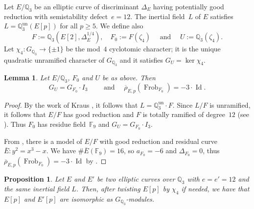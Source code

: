 \documentclass[12pt]{amsart}
\numberwithin{equation}{section}
\newtheorem{lemma}[equation]{Lemma}
\newtheorem{proposition}[equation]{Proposition}
\theoremstyle{definition}
\newcommand{\F}{\mathbb{F}}
\newcommand{\Q}{\mathbb{Q}}
\newcommand{\rhobar}{{\overline{\rho}}}
\DeclareMathOperator{\Frob}{Frob}
\DeclareMathOperator{\Id}{Id}
\begin{document}
Let $E/\Q_3$ be an elliptic curve of discriminant $\Delta_E$ having potentially good reduction with semistability defect~$e=12$.
The inertial field~$L$ of $E$ satisfies
$L = \Q_3^{\text{un}}(E[p])$ for all $p \geq 5$.
We define also
\[
F:=\Q_3(E[2], \Delta_E^{1/4}), \quad F_0:=F(\zeta_4) \quad \text{ and } \quad U:=\Q_3(\zeta_4).
\]
Let $\chi_4 : G_{\Q_3} \to \{ \pm 1 \}$ be the mod~$4$ cyclotomic character; it is the unique quadratic unramified character of $G_{\Q_3}$ and it satisfies $G_U = \ker \chi_4$.
\begin{lemma}\label{lem:l3non-ab}
    Let $E/\Q_3$, $F_0$ and $U$ be as above. Then
    \[
     G_{U}=G_{F_0} \cdot I_3 \qquad \text{ and } \quad \rhobar_{E,p}(\Frob_{F_0})=-3 \cdot \Id.
    \]
\end{lemma}
\begin{proof}
    By the work of Kraus \cite[Corollaire to Lemme 3]{Kraus}, it follows that $L=\Q_3^{\text{un}}\cdot F$.
    Since $L/F$ is unramified, it follows that $E/F$ has good reduction and
    $F$ is totally ramified of degree~$12$ (see \cite[Remark 3.1]{Cop3adic}). Thus $F_0$ has residue field~$\F_9$ and $G_{U}=G_{F_0} \cdot I_3$.

    From \cite[Lemma 3.4]{Cop3adic}, there is a model of $E/F$ with good reduction and residual curve $\overline{E}: y^2=x^3-x$. We have $\# \overline{E}(\F_9)=16$, so $a_{F_0} = -6$ and $\Delta_{F_0} = 0$, 
thus $\rhobar_{E,p}(\Frob_{F_0})=-3 \cdot \Id$ by \cite[Theorem 2]{Centeleghe}.
\end{proof}

\begin{proposition}\label{prop:l3non-ab}
Let $E$ and $E'$ be two elliptic curves over $\Q_3$ with $e=e'=12$
    and the same inertial field $L$.
    Then, after twisting $E[p]$ by $\chi_4$ if needed, we have that $E[p]$ and $E'[p]$ are isomorphic as $G_{\Q_3}$-modules.
\end{proposition}
\end{document}
